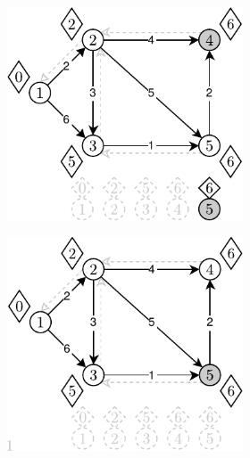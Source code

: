 \begin{figure}[!h]
\begin{subfigure}[b]{\textwidth}
\begin{subfigure}[b]{0.3\textwidth}
			\caption{}
			\label{fig:exapleDijkstraDLList:d}
		\end{subfigure}
		\hfill
		\begin{subfigure}[b]{0.3\textwidth}
			\includegraphics[width=\textwidth]{Chapter_II/DIJKSTRA-DLList/e.pdf}
			\caption{}
			\label{fig:exapleDijkstraDLList:e}
		\end{subfigure}
		\hfill
		\begin{subfigure}[b]{0.3\textwidth}
			\includegraphics[width=\textwidth]{Chapter_II/DIJKSTRA-DLList/f.pdf}

\end{subfigure}
\end{subfigure}
\end{figure}
